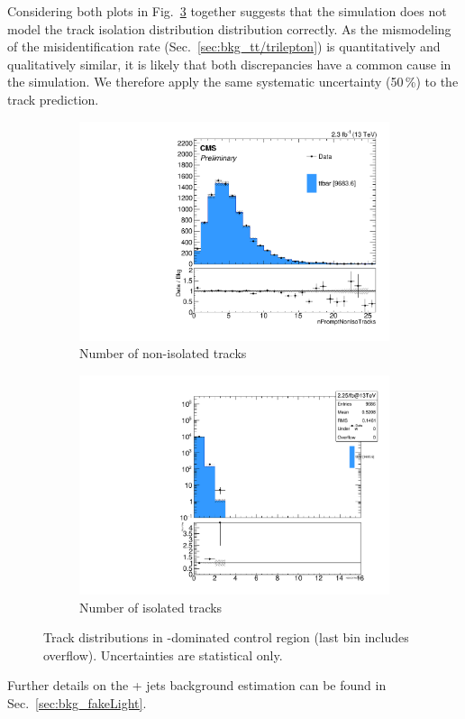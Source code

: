 Considering both plots in Fig.~\ref{fig:tt/track} together suggests that the \ttbar simulation does not model the track isolation distribution distribution correctly. As the mismodeling of the \ttbar misidentification rate (Sec.~\ref{sec:bkg_tt/trilepton}) is quantitatively and qualitatively similar, it is likely that both discrepancies have a common cause in the simulation. We therefore apply the same systematic uncertainty (50\,\%) to the track prediction.

\begin{figure}
\begin{center}
	\begin{subfigure}[b]{.7\textwidth}
		\includegraphics[width=\textwidth]{Background/bkg_tt/ttbar_NPROMPTNONISOINCLUSIVETRACKS7_STgt300}
		\caption{Number of non-isolated tracks } \label{fig:tt/trackNonIso}
	\end{subfigure}
	\begin{subfigure}[b]{.7\textwidth}
		\includegraphics[width=\textwidth]{Background/bkg_tt/ttbar_NGOODTRACKS_STgt300}
		\caption{Number of isolated tracks } \label{fig:tt/trackIso}
	\end{subfigure}
	\caption{Track distributions in \ttbar-dominated control region (last bin includes overflow). Uncertainties are statistical only.
	\label{fig:tt/track}}
\end{center}
\end{figure}

Further details on the \Z + jets background estimation can be found in Sec.~\ref{sec:bkg_fakeLight}.
